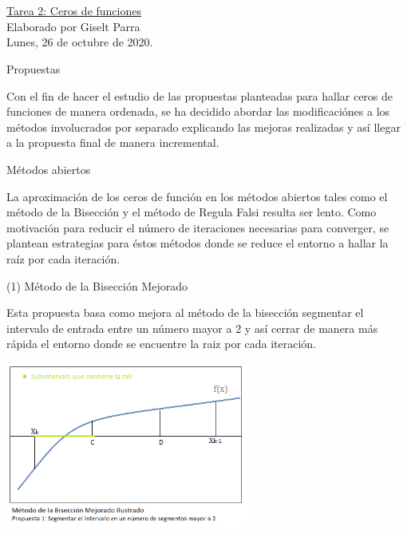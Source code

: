 \documentclass[11pt]{article}
\begin{document}
\begin{center}
 \Large \underline {\\ \\Tarea 2: Ceros de funciones} \\ \medskip
 \small  {Elaborado por Giselt Parra}\\ 
 \footnotesize{Lunes, 26 de octubre de 2020.}
\end{center}


\begin{center} \Large {Propuestas} \end{center}

Con el fin de hacer el estudio de las propuestas planteadas para hallar ceros de funciones de manera ordenada, se ha decidido abordar las modificaciónes a los métodos involucrados por separado explicando las mejoras realizadas y así llegar a la propuesta final de manera incremental. 


\begin{center} \large {Métodos abiertos} \end{center}

La aproximación de los ceros de función en los métodos abiertos tales como el método de la Bisección y el método de Regula Falsi resulta ser lento. Como motivación para reducir el número de iteraciones necesarias para converger, se plantean estrategias para éstos métodos donde se reduce el entorno a hallar la raíz por cada iteración.

\vspace{0.5cm}
{\large (1) Método de la Bisección Mejorado}

Esta propuesta basa como mejora al método de la bisección segmentar el intervalo de entrada entre un número mayor a 2 y así cerrar de manera más rápida el entorno donde se encuentre la raiz por cada iteración.





\vspace{0.25cm}	
\begin{center}
\includegraphics[keepaspectratio, width=8cm]{P11.png}
\end{center}
\vspace{0.25cm}
\end{document}

